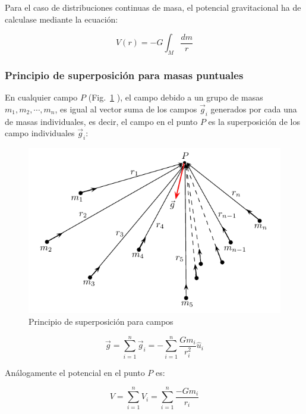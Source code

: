 Para el caso de distribuciones continuas de masa, el potencial gravitacional ha de calculase mediante la ecuación:

\begin{equation}
\boxed{V(r)= -G\int_M \dfrac{dm}{r}}
\end{equation}

\subsubsection{Principio de superposición para masas puntuales}

En cualquier campo $P$ (Fig.~\ref{camposuperposicion} ), el campo debido a un grupo de masas $m_1, m_2, \cdots, m_n$, es igual al vector suma de los campos $\vec{g}_i$ generados por cada una de masas individuales, es decir, el campo en el punto $P$ es la superposición de los campo individuales $\vec{g}_i$:

\begin{figure}[h]
\begin{center}
\includegraphics[scale=0.7]{gravitacion/camposuperposicion}
\end{center}
\caption{Principio de superposición para campos}
\label{camposuperposicion}
\end{figure}

\begin{equation}
\vec{g}=\sum_{i=1}^{n}\vec{g}_i = -\sum_{i=1}^{n}\dfrac{Gm_i}{r_i^2} \hat{u}_i
\end{equation}


Análogamente el potencial en el punto $P$ es:

\begin{equation}
V=\sum_{i=1}^{n}V_i = \sum_{i=1}^{n} \dfrac{-Gm_i}{r_i}
\end{equation}









